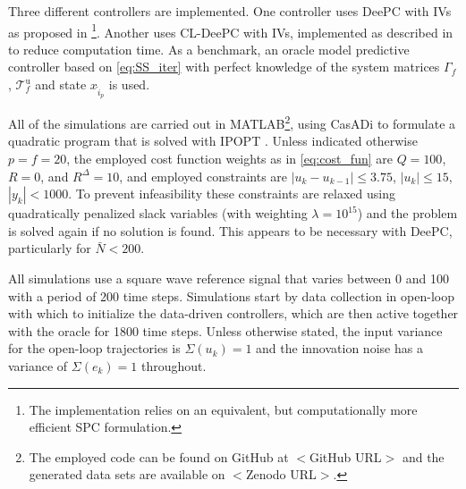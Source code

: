 Three different controllers are implemented. One controller uses \ac{DeePC} with \ac{IVs} as proposed in \cite{vanWingerden2022}\footnote{The implementation relies on an equivalent, but computationally more efficient \ac{SPC} formulation.}. Another uses \ac{CL-DeePC} with \ac{IVs}, implemented as described in  to reduce computation time. As a benchmark, an oracle model predictive controller based on \eqref{eq:SS_iter} with perfect knowledge of the system matrices $\Gamma_f$, $\mathcal{T}_f^\mathrm{u}$ and state $x_{\hat{i}_p}$ is used.

All of the simulations are carried out in MATLAB\footnote{The employed code can be found on GitHub at $<$GitHub URL$>$ and the generated data sets are available on $<$Zenodo URL$>$.}, using CasADi \citep{Andersson2019} to formulate a quadratic program that is solved with IPOPT \citep{Wachter2006}. Unless indicated otherwise $p=f=20$, the employed cost function weights as in \eqref{eq:cost_fun} are $Q=100$, $R=0$, and $R^\Delta=10$, and employed constraints are $|u_k-u_{k-1}|\leq3.75$, $|u_k|\leq15$, $|y_k|<1000$. To prevent infeasibility these constraints are relaxed using quadratically penalized slack variables (with weighting $\lambda=10^{15}$) and the problem is solved again if no solution is found. This appears to be necessary with \ac{DeePC}, particularly for $\bar{N}<200$.

All simulations use a square wave reference signal that varies between 0 and 100 with a period of 200 time steps. Simulations start by data collection in open-loop with which to initialize the data-driven controllers, which are then active together with the oracle for 1800 time steps. Unless otherwise stated, the input variance for the open-loop trajectories is $\Sigma(u_k)=1$ and the innovation noise has a variance of $\Sigma(e_k)=1$ throughout.